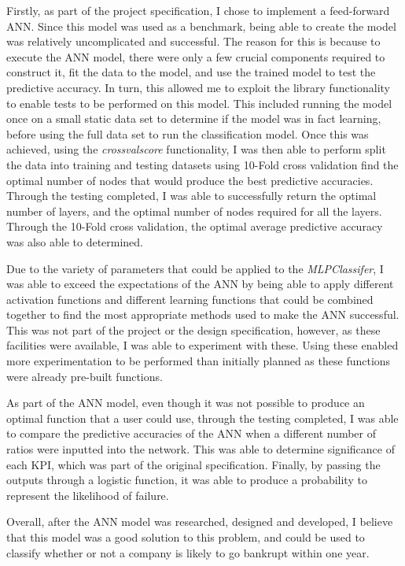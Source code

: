 \documentclass[11pt]{article}
\begin{document}
Firstly, as part of the project specification, I chose to implement a feed-forward ANN. Since this model was used as a benchmark, being able to create the model was relatively uncomplicated and successful. The reason for this is because to execute the ANN model, there were only a few crucial components required to construct it, fit the data to the model, and use the trained model to test the predictive accuracy. In turn, this allowed me to exploit the library functionality to enable tests to be performed on this model. This included running the model once on a small static data set to determine if the model was in fact learning, before using the full data set to run the classification model. Once this was achieved, using the \textit{cross\textunderscore val\textunderscore score} functionality, I was then able to perform split the data into training and testing datasets using 10-Fold cross validation find the optimal number of nodes that would produce the best predictive accuracies. Through the testing completed, I was able to successfully return the optimal number of layers, and the optimal number of nodes required for all the layers. Through the 10-Fold cross validation, the optimal average predictive accuracy was also able to determined.

Due to the variety of parameters that could be applied to the \textit{MLPClassifer}, I was able to exceed the expectations of the ANN by being able to apply different activation functions and different learning functions that could be combined together to find the most appropriate methods used to make the ANN successful. This was not part of the project or the design specification, however, as these facilities were available, I was able to experiment with these. Using these enabled more experimentation to be performed than initially planned as these functions were already pre-built functions. 

As part of the ANN model, even though it was not possible to produce an optimal function that a user could use, through the testing completed, I was able to compare the predictive accuracies of the ANN when a different number of ratios were inputted into the network. This was able to determine significance of each KPI, which was part of the original specification. Finally, by passing the outputs through a logistic function, it was able to produce a probability to represent the likelihood of failure. 

Overall, after the ANN model was researched, designed and developed, I believe that this model was a good solution to this problem, and could be used to classify whether or not a company is likely to go bankrupt within one year. \\
\end{document}

